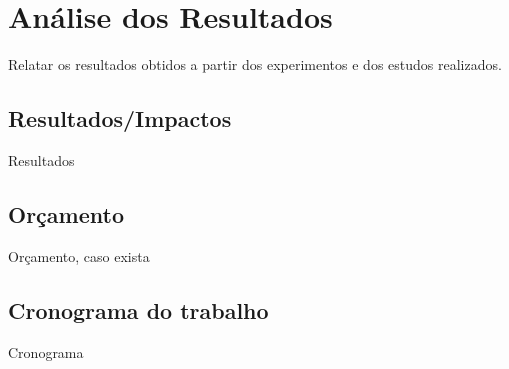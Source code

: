 \chapter{Análise dos Resultados}
\label{cap:04}

Relatar os resultados obtidos a partir dos experimentos e dos estudos realizados. 


\section{Resultados/Impactos}

Resultados


\section{Orçamento}

Orçamento, caso exista


\section{Cronograma do trabalho}

Cronograma
